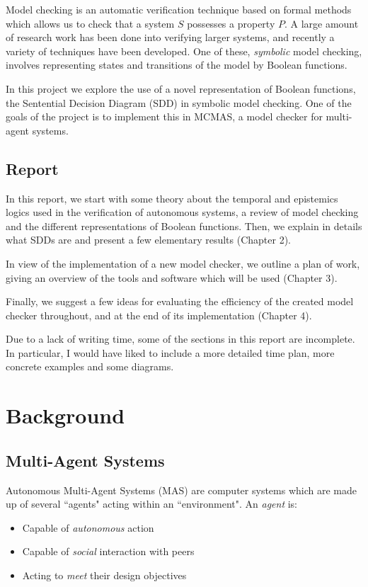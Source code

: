 \documentclass{article}
\newenvironment{remark}[1][Remark]{\begin{trivlist}
\item[\hskip \labelsep {\bfseries #1}]}{\end{trivlist}}
\begin{document}
Model checking is an automatic verification technique based on formal methods which allows us to check that a system $S$ possesses a property $P$.  A large amount of research work has been done into verifying larger systems, and recently a variety of techniques have been developed. One of these, \emph{symbolic} model checking, involves representing states and transitions of the model by Boolean functions.

In this project we explore the use of a novel representation of Boolean functions, the Sentential Decision Diagram (SDD) in symbolic model checking. One of the goals of the project is to implement this in MCMAS, a model checker for multi-agent systems. 

\subsection{Report}

In this report, we start with some theory about the temporal and epistemics logics used in the verification of autonomous systems, a review of model checking and the different representations of Boolean functions. Then, we explain in details what SDDs are and present a few elementary results (Chapter 2).

 In view of the implementation of a new model checker, we outline a plan of work, giving an overview of the tools and software which will be used (Chapter 3).
 
 Finally, we suggest a few ideas for evaluating the efficiency of the created model checker throughout, and at the end of its implementation (Chapter 4).

\begin{remark}
Due to a lack of writing time, some of the sections in this report are incomplete. In particular, I would have liked to include a more detailed time plan, more concrete examples and some diagrams. 
\end{remark}

\clearpage
\section{Background}

\subsection{Multi-Agent Systems}

Autonomous Multi-Agent Systems (MAS) are computer systems which are made up of several ``agents" acting within an ``environment". 
An \textit{agent} is: 
\begin{itemize}
\item Capable of \textit{autonomous} action 
\item Capable of \textit{social} interaction with peers
\item Acting to \textit{meet} their design objectives 
\end{itemize}
 
\end{document}

